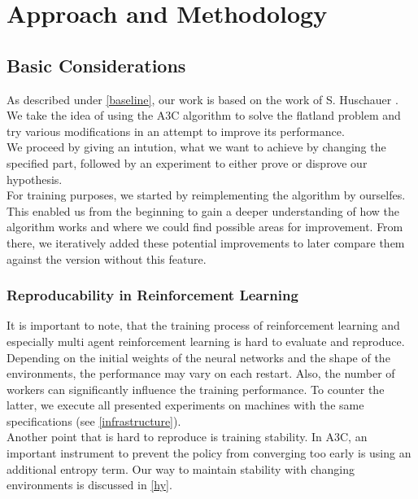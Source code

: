 \usepackage{hyperref}

%
%

\chapter{Approach and Methodology}\label{chap.vorgehen}
\section{Basic Considerations}\label{basic_cons}
As described under \autoref{baseline}, our work is based on the work of S. Huschauer \cite{flatlandstephan}. We take the idea of using the A3C algorithm to solve the flatland problem and try various modifications in an attempt to improve its performance.\\
We proceed by giving an intution, what we want to achieve by changing the specified part, followed by an experiment to either prove or disprove our hypothesis.\\
For training purposes, we started by reimplementing the algorithm by ourselfes. This enabled us from the beginning to gain a deeper understanding of how the algorithm works and where we could find possible areas for improvement. From there, we iteratively added these potential improvements to later compare them against the version without this feature.

\subsection*{Reproducability in Reinforcement Learning}\label{enhanced_observations}
It is important to note, that the training process of reinforcement learning and especially multi agent reinforcement learning is hard to evaluate and reproduce. Depending on the initial weights of the neural networks and the shape of the environments, the performance may vary on each restart. Also, the number of workers can 
significantly influence the training performance. To counter the latter, we execute all presented experiments on machines with the same specifications (see \autoref{infrastructure}).\\
Another point that is hard to reproduce is training stability. In A3C, an important instrument to prevent the policy from converging too early is using an additional entropy term. Our way to maintain stability with changing environments is discussed in \autoref{hy}.

